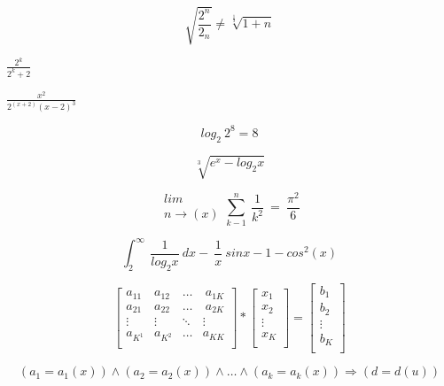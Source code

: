 \documentclass [18pt, a4paper] {article}
\begin{document}
\begin{center}
 $$ \sqrt{ \frac{2^{n}}{2_n}} \neq \sqrt[\frac{1}{3}]{1+n} $$
\end{center}
\begin{center}
 $ \frac {2^k} {2^k+2} $
\end{center}
\begin{center}
 $ \frac {x^2} {2^(x+2)(x-2)^3} $
\end{center}
\begin{center}
 $$ {log_2 \ 2^8 = 8} $$
\end{center}
\begin{center}
 $$ \sqrt [3] {e^x-log_2x} $$
\end{center}
\begin{center}
$$ \begin{array}{c}lim \\n\rightarrow(x)\end{array}  \sum_{k-1}^n\ \frac {1} {k^2} \ = \ \frac{\pi^2} {6}$$
\end{center}
\begin{center}
$$ \int^\infty_2 \ \frac {1} {log_2x} \ dx- \ \frac {1} {x} \ sin x - 1 - cos^2(x) $$
\end{center}
\begin{center}
$$
\left[ \begin{array} {cccc}
a_{11} & a_{12} & \ldots &\ a_{1K}\\
a_{21} & a_{22} & \ldots &\ a_{2K}\\
\vdots & \vdots & \ddots &\vdots  \\
a_{K^1}& a_{K^2}& \ldots & a_{KK} \\
\end{array} \right] * \left[\begin{array} {c}
x_1 \\
x_2 \\
\vdots \\
x_K \\
\end{array} \right] = \left[\begin{array} {c}
b_1 \\
b_2 \\
\vdots \\
b_K \\
\end{array} \right] $$
\end{center}
\begin{center}
$$ (a_1=a_1(x)) \wedge (a_2 = a_2(x)) \wedge \ldots \wedge (a_k = a_k(x)) \Rightarrow (d = d(u)) $$
\end{center}
\end{document}
